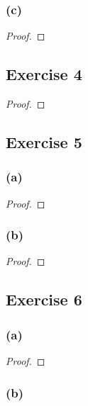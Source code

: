 \documentclass[14pt]{extarticle}
\begin{document}
\subsubsection{(c)}

\begin{proof}

\end{proof}

\subsection{Exercise 4}

\begin{proof}

\end{proof}

\subsection{Exercise 5}

\subsubsection{(a)}

\begin{proof}

\end{proof}

\subsubsection{(b)}

\begin{proof}

\end{proof}

\subsection{Exercise 6}

\subsubsection{(a)}

\begin{proof}

\end{proof}

\subsubsection{(b)}
\end{document}
